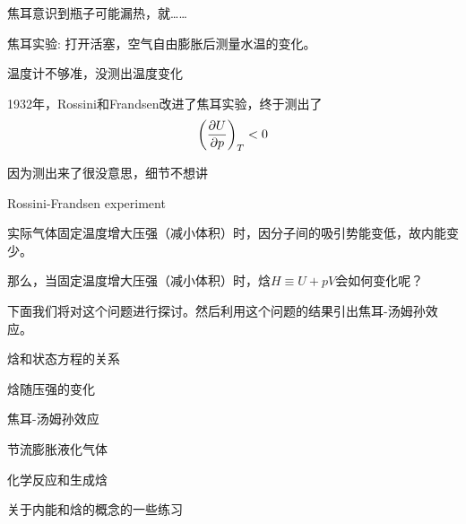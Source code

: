 \documentclass[CJK]{beamer}
\begin{document}
\begin{frame}
\bch
焦耳意识到瓶子可能漏热，就……

焦耳实验: 打开活塞，空气自由膨胀后测量水温的变化。
\emini
{}
\emini

\ech
\end{frame}


\begin{frame}
\bch


温度计不够准，没测出温度变化 
\ech
\end{frame}


\begin{frame}
\bch
1932年，Rossini和Frandsen改进了焦耳实验，终于测出了
$$\left(\frac{\partial U}{\partial p}\right)_{T} < 0 $$

\skiplines

因为测出来了很没意思，细节不想讲\bye
\ech
\end{frame}

\begin{frame}
\bch
{}
\emini
{}
Rossini-Frandsen experiment

\emini

\ech
\end{frame}

\begin{frame}
\bch
实际气体固定温度增大压强（减小体积）时，因分子间的吸引势能变低，故内能变少。


那么，当固定温度增大压强（减小体积）时，焓$H\equiv U + pV$会如何变化呢？

\skiplines

下面我们将对这个问题进行探讨。然后利用这个问题的结果引出焦耳-汤姆孙效应。
\ech
\end{frame}


\begin{frame}
\bch
\bitem
\item{焓和状态方程的关系}
\item{焓随压强的变化}
\item{焦耳-汤姆孙效应}
\item{节流膨胀液化气体}
\item{化学反应和生成焓}
\item{关于内能和焓的概念的一些练习}
\eitem
\ech
\end{frame}
\end{document}
